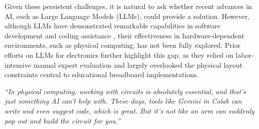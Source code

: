 \documentclass{article} %
\begin{document}

Given these persistent challenges, it is natural to ask whether recent advances in AI, such as Large Language Models (LLMs), could provide a solution.
However, although LLMs have demonstrated remarkable capabilities in software development and coding assistance \citep{annepaka2024large,wang2024enhancing}, their effectiveness in hardware-dependent environments, such as physical computing, has not been fully explored.
Prior efforts on LLMs for electronics \citep{jansen2023words,yang2024embedgenius} further highlight this gap, as they relied on labor-intensive manual expert evaluation and largely overlooked the physical layout constraints central to educational breadboard implementations.

\begin{minipage}{\textwidth}
\setlength{\leftskip}{3cm}
\setlength{\rightskip}{3cm}
\raggedright{\textit{
``In physical computing, working with circuits is absolutely essential, and that’s just something AI can’t help with.
These days, tools like Gemini in Colab can write and even suggest code, which is great. But it’s not like an arm can suddenly pop out and build the circuit for you.''
}}\\[0.5em]
\end{minipage}
\end{document}
